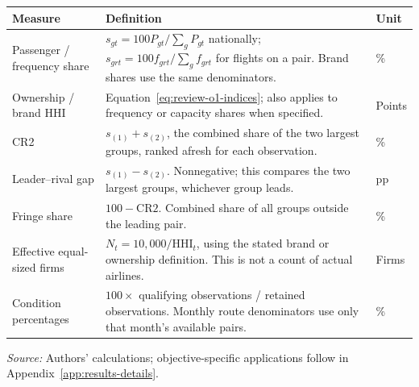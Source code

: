 \begin{minipage}{\linewidth}
\captionsetup{font=small,labelfont=bf,justification=raggedright,singlelinecheck=false,hypcap=false}
\label{tab:o4-dictionary-measures}
\centering
{\footnotesize{}\setlength{\tabcolsep}{4pt}\fontsize{10}{12}\selectfont{}\setlength{\tabcolsep}{3pt}
\renewcommand{\arraystretch}{1.15}
\begin{tabular}{|>{\raggedright\arraybackslash}p{}|>{\raggedright\arraybackslash}p{}|>{\raggedright\arraybackslash}p{}|}
\hline
\textbf{Measure} & \textbf{Definition} & \textbf{Unit} \\
\hline
Passenger / frequency share & $s_{gt}=100P_{gt}/\sum_gP_{gt}$ nationally; $s_{grt}=100f_{grt}/\sum_gf_{grt}$ for flights on a pair. Brand shares use the same denominators. & \% \\
\hline
Ownership / brand HHI & Equation~\ref{eq:review-o1-indices}; also applies to frequency or capacity shares when specified. & Points \\
\hline
CR2 & $s_{(1)}+s_{(2)}$, the combined share of the two largest groups, ranked afresh for each observation. & \% \\
\hline
Leader--rival gap & $s_{(1)}-s_{(2)}$. Nonnegative; this compares the two largest groups, whichever group leads. & pp \\
\hline
Fringe share & $100-\mathrm{CR2}$. Combined share of all groups outside the leading pair. & \% \\
\hline
Effective equal-sized firms & $N_t=10{,}000/\mathrm{HHI}_t$, using the stated brand or ownership definition. This is not a count of actual airlines. & Firms \\
\hline
Condition percentages & $100\times$ qualifying observations / retained observations. Monthly route denominators use only that month's available pairs. & \% \\
\hline
\end{tabular}
\par}
\vspace{4pt}
{\footnotesize{}\raggedright\textit{Source:} Authors' calculations; objective-specific applications follow in Appendix~\ref{app:results-details}.\par}
\end{minipage}

